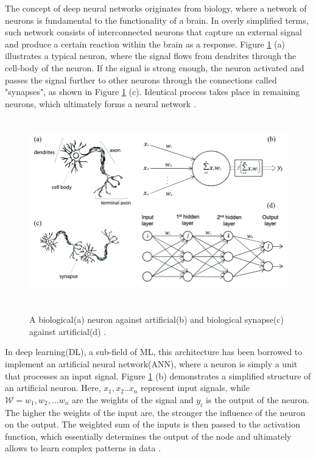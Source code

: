 The concept of deep neural networks originates from biology, where a network of neurons is fundamental to the functionality of a brain. In overly simplified terms, such network consists of interconnected neurons that capture an external signal and produce a certain reaction within the brain as a response. Figure \ref{NeuronSchem} (a) illustrates a typical neuron, where the signal flows from dendrites through the cell-body of the neuron. If the signal is strong enough, the neuron activated and passes the signal further to other neurons through the connections called "synapses", as shown in Figure \ref{NeuronSchem} (c). Identical process takes place in remaining neurons, which ultimately forms a neural network \cite{Mehlig_2021}.

\begin{figure}[htb]
	\begin{center}
		\includegraphics[height=8cm]{./BioNeuronVsArtificial.png}
	\end{center}
	\caption{A biological(a) neuron against artificial(b) and biological synapse(c) against artificial(d) \cite{article1}.}
	\begin{center}
		\label{NeuronSchem}
	\end{center}
\end{figure}
\FloatBarrier

In deep learning(DL), a sub-field of ML, this architecture has been borrowed to implement an artificial neural network(ANN), where a neuron is simply a unit that processes an input signal. Figure \ref{NeuronSchem} (b) demonstrates a simplified structure of an artificial neuron. Here, $x_1, x_2..x_n$ represent input signals, while $\mathcal{W} = w_1, w_2, ... w_n$ are the weights of the signal and $y_i$ is the output of the neuron. The higher the weights of the input are, the stronger the influence of the neuron on the output. The weighted sum of the inputs is then passed to the activation function, which essentially determines the output of the node and ultimately allows to learn complex patterns in data \cite{Mehlig_2021}. 

